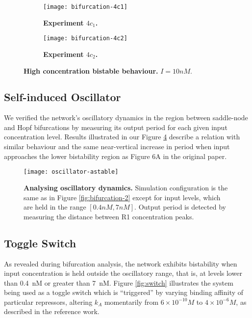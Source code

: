     \begin{figure}[!htb]
      \centering
      \begin{subfigure}[t]{0.45\textwidth}
        \centering
        \texttt{[image: bifurcation-4c1]}
        \caption{\textbf{Experiment $4c_{1}$.}}
        \label{fig:bifurcation-4c1}
      \end{subfigure}
      \hfill
      \begin{subfigure}[t]{0.45\textwidth}
        \centering
        \texttt{[image: bifurcation-4c2]}
        \caption{\textbf{Experiment $4c_{2}$.}}
        \label{fig:bifurcation-4c2}
      \end{subfigure}
      \caption{\textbf{High concentration bistable behaviour.} $I = 10 nM$.}
      \label{fig:bifurcation-4}
    \end{figure}


  \subsection{Self-induced Oscillator}

    We verified the network's oscillatory dynamics in the region between saddle-node and Hopf bifurcations by measuring its output period for each given input concentration level.
    Results illustrated in our Figure \ref{fig:oscillator-astable} describe a relation with similar behaviour and the same near-vertical increase in period when input approaches the lower bistability region as Figure 6A in the original paper.

    \begin{figure}[!htb]
      \centering
      \texttt{[image: oscillator-astable]}
      \caption{\textbf{Analysing oscillatory dynamics.} Simulation configuration is the same as in Figure \ref{fig:bifurcation-2} except for input levels, which are held in the range $[0.4 nM, 7 nM]$. Output period is detected by measuring the distance between R1 concentration peaks.}
      \label{fig:oscillator-astable}
    \end{figure}


  \subsection{Toggle Switch}

    As revealed during bifurcation analysis, the network exhibits bistability when input concentration is held outside the oscillatory range, that is, at levels lower than \SI{0.4}{\nano M} or greater than \SI{7}{\nano M}.
    Figure \ref{fig:switch} illustrates the system being used as a toggle switch which is ``triggered'' by varying binding affinity of particular repressors, altering $k_A$ momentarily from $6 \times 10^{-10} M$ to $4 \times 10^{-6} M$, as described in the reference work.

